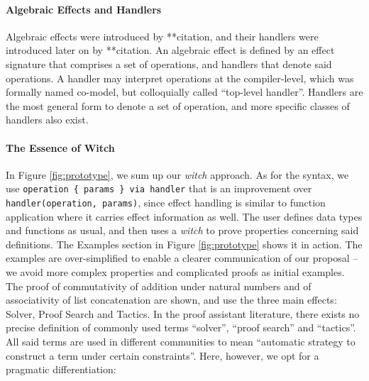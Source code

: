 \documentclass[sigconfl]{acmart}
\begin{document}
\paragraph{Algebraic Effects and Handlers} Algebraic effects were introduced by
**citation, and their handlers were introduced later on by **citation. An
algebraic effect is defined by an effect signature that comprises a set of
operations, and handlers that denote said operations. A handler may interpret
operations at the compiler-level, which was formally named co-model, but
colloquially called ``top-level handler''. Handlers are the most general form to
denote a set of operation, and more specific classes of handlers also exist.

\paragraph{The Essence of Witch}
In Figure \ref{fig:prototype}, we sum up our \textit{witch} approach.
As for the syntax, we use \texttt{operation \{ params \} via handler} that is an
improvement over \texttt{handler(operation, params)}, since effect handling is similar
to function application where it carries effect information as well.
The user defines data types and functions as usual, and then uses a
\textit{witch} to prove properties concerning said definitions. The Examples
section in Figure \ref{fig:prototype} shows it in action. The examples are
over-simplified to enable a clearer communication of our proposal -- we avoid
more complex properties and complicated proofs as initial examples. The proof of
commutativity of addition under natural numbers and of associativity of list
concatenation are shown, and use the three main effects: Solver, Proof Search
and Tactics. In the proof assistant literature, there exists no precise
definition of commonly used terms ``solver'', ``proof search'' and ``tactics''.
All said terms are used in different communities to mean ``automatic strategy to
construct a term under certain constraints''. Here, however, we opt for a
pragmatic differentiation:
\end{document}
